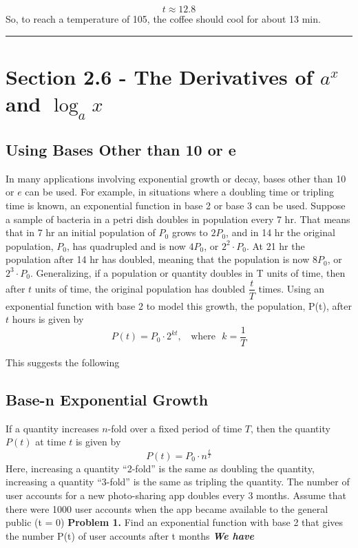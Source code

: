 \documentclass{report}
\begin{document}
$$ t \approx 12.8$$
\bigbreak \noindent
So, to reach a temperature of 105, the coffee should cool for about 13 min.
\bigbreak \noindent
\hrule
\section*{Section 2.6 - The Derivatives of $a^x$ and $\log_ax$ }
\bigbreak \noindent
\subsection*{Using Bases Other than 10 or e}
\begin{mdframed}
In many applications involving exponential growth or decay, bases other than 10 or $e$ can be used.
\bigbreak \noindent
For example, in situations where a doubling time or tripling time is known, an exponential function in base 2 or base 3 can be used.
\bigbreak \noindent
Suppose a sample of bacteria in a petri dish doubles in population every 7 hr. That means that in 7 hr an initial population of $P_0$ grows to $2P_0$, and in 14 hr the original population, $P_0$, has  quadrupled and is now $4P_0$, or $2^2 \cdot P_0$. At 21 hr the population after 14 hr has doubled, meaning that the population is now $8P_0$, or $2^3\cdot P_0$. Generalizing, if a population or quantity doubles in T units of time, then after $t$ units of time, the original population has doubled $\dfrac{t}{T}$ times. Using an exponential function with base 2 to model this growth, the population, P(t), after $t$ hours is given by
$$ P(t) = P_0 \cdot 2^{kt}, \ \ \ \ \text{where} \ \ \ k = \dfrac{1}{T}$$
\end{mdframed}
This suggests the following
\subsection*{Base-n Exponential Growth}
If a quantity increases $n$-fold over a fixed period of time $T$, then the quantity $P(t)$ at time $t$ is given by
$$ P(t) = P_0 \cdot {n}^{\frac{t}{T}}$$
Here, increasing a quantity ``2-fold'' is the same as doubling the quantity, increasing a quantity ``3-fold'' is the same as tripling the quantity.
\q
The number of user accounts for a new photo-sharing app doubles every 3 months. Assume that there were 1000 user accounts when the app became available to the general public (t = 0)
\bigbreak \noindent
\textbf{Problem 1.} Find an exponential function with base 2 that gives the number P(t) of user accounts after t months
\bigbreak \noindent
\textit{\textbf{We have}}
\end{document}
